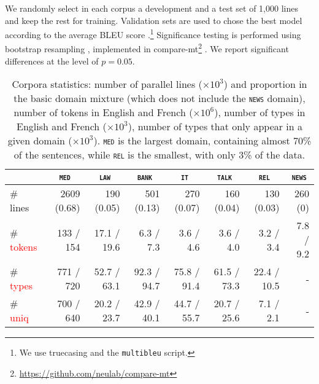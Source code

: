 \documentclass[11pt,a4paper]{article}
\newcommand{\fyDone}[1]{\done[FY]\Todo[FY:]{\textcolor{orange}{#1}}}
\newcommand{\revision}[1]{\textcolor{red}{#1}}
\newcommand{\domain}[1]{\texttt{\textsc{#1}}}
\begin{document}
We randomly select in each corpus a development and a test set of 1,000 lines and keep the rest for training. Validation sets are used to chose the best model according to the average BLEU score \cite{Papineni02bleu}.\footnote{We use truecasing and the \texttt{multibleu} script.}\fyDone{A word about meta-parameter settings} Significance testing is performed using bootstrap resampling \cite{Koehn04statistical}, implemented in compare-mt\footnote{\url{https://github.com/neulab/compare-mt}} \cite{Neubig19compare-mt}. We report significant differences at the level of $p=0.05$.\fyDone{Fix correct p value}


\begin{table*}[htbp]
  \centering
  \begin{tabular}{|l|rrrrrrr|} %
    \cline{2-8} 
    \multicolumn{1}{c|}{} & \multicolumn{1}{c}{\domain{med}} & \multicolumn{1}{c}{\domain{law}} & \multicolumn{1}{c}{\domain{bank}} & \multicolumn{1}{c}{\domain{it}} & \multicolumn{1}{c}{\domain{talk}} & \multicolumn{1}{c}{\domain{rel}} & \multicolumn{1}{c|}{\domain{news}} \\
    \hline 
    \# lines & 2609 (0.68) & 190 (0.05)  & 501 (0.13) & 270 (0.07) & 160 (0.04) & 130 (0.03) & 260 (0) \\
    \# \revision{tokens}  &  133 / 154  &  17.1 / 19.6 &  6.3 / 7.3 &  3.6 / 4.6 &  3.6 / 4.0 &  3.2 / 3.4 & 7.8 / 9.2   \\
    \# \revision{types}  & 771 / 720 & 52.7 / 63.1 & 92.3 / 94.7 & 75.8 / 91.4 & 61.5 / 73.3 & 22.4 / 10.5 & - \\
    \# \revision{uniq} & 700 / 640 & 20.2 / 23.7 & 42.9 / 40.1 & 44.7 / 55.7 & 20.7 / 25.6 & 7.1 / 2.1 & - \\
    \hline
  \end{tabular}
  \caption{Corpora statistics: number of parallel lines ($\times 10^3$) and proportion in the basic domain mixture (which does not include the \domain{news} domain), number of tokens in English and French ($\times 10^6$), number of types in English and French ($\times 10^3$), number of types that only appear in a given domain ($\times 10^3$). \domain{med} is the largest domain, containing almost 70\% of the sentences, while \domain{rel} is the smallest, with only 3\% of the data.
  }
\label{tab:Corpora}
\end{table*}
\end{document}
